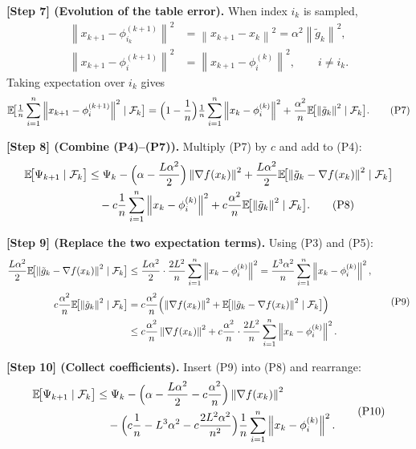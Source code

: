 \documentclass{article}
\newcommand{\E}{\mathbb{E}}
\newcommand{\norm}[1]{\left\|#1\right\|}
\newcommand{\grad}{\nabla}
\begin{document}
\noindent\textbf{[Step 7] (Evolution of the table error).}  
When index $i_k$ is sampled,
\[
\begin{aligned}
\norm{x_{k+1}-\phi_{i_k}^{(k+1)}}^{2}
&= \norm{x_{k+1}-x_k}^{2}= \alpha^{2}\norm{\tilde g_k}^{2},\\
\norm{x_{k+1}-\phi_{i}^{(k+1)}}^{2}
&= \norm{x_{k+1}-\phi_{i}^{(k)}}^{2},
\qquad i\neq i_k .
\end{aligned}
\]
Taking expectation over $i_k$ gives
\[
\E\!\bigl[\tfrac1n\sum_{i=1}^{n}\norm{x_{k+1}-\phi_i^{(k+1)}}^{2}\mid\mathcal{F}_k\bigr]
= \Bigl(1-\frac1n\Bigr)\tfrac1n\sum_{i=1}^{n}\norm{x_k-\phi_i^{(k)}}^{2}
   +\frac{\alpha^{2}}{n}\E\!\bigl[\norm{\tilde g_k}^{2}\mid\mathcal{F}_k\bigr].
\tag{P7}
\]

\noindent\textbf{[Step 8] (Combine (P4)–(P7)).}  
Multiply (P7) by $c$ and add to (P4):
\[
\begin{aligned}
\E\!\bigl[\Psi_{k+1}\mid\mathcal{F}_k\bigr]
&\le \Psi_k 
   -\Bigl(\alpha-\frac{L\alpha^{2}}{2}\Bigr)\norm{\grad f(x_k)}^{2}
   +\frac{L\alpha^{2}}{2}\E\!\bigl[\norm{\tilde g_k-\grad f(x_k)}^{2}\mid\mathcal{F}_k\bigr] \\
&\quad
   -c\frac1n\sum_{i=1}^{n}\norm{x_k-\phi_i^{(k)}}^{2}
   +c\frac{\alpha^{2}}{n}\E\!\bigl[\norm{\tilde g_k}^{2}\mid\mathcal{F}_k\bigr].
\tag{P8}
\end{aligned}
\]

\noindent\textbf{[Step 9] (Replace the two expectation terms).}  
Using (P3) and (P5):
\[
\begin{aligned}
\frac{L\alpha^{2}}{2}\E\!\bigl[\norm{\tilde g_k-\grad f(x_k)}^{2}\mid\mathcal{F}_k\bigr]
&\le \frac{L\alpha^{2}}{2}\cdot\frac{2L^{2}}{n}\sum_{i=1}^{n}\norm{x_k-\phi_i^{(k)}}^{2}
   =\frac{L^{3}\alpha^{2}}{n}\sum_{i=1}^{n}\norm{x_k-\phi_i^{(k)}}^{2},\\[1mm]
c\frac{\alpha^{2}}{n}\E\!\bigl[\norm{\tilde g_k}^{2}\mid\mathcal{F}_k\bigr]
&=c\frac{\alpha^{2}}{n}\Bigl(\norm{\grad f(x_k)}^{2}
   +\E\!\bigl[\norm{\tilde g_k-\grad f(x_k)}^{2}\mid\mathcal{F}_k\bigr]\Bigr)\\
&\le c\frac{\alpha^{2}}{n}\norm{\grad f(x_k)}^{2}
   +c\frac{\alpha^{2}}{n}\cdot\frac{2L^{2}}{n}\sum_{i=1}^{n}\norm{x_k-\phi_i^{(k)}}^{2}.
\end{aligned}
\tag{P9}
\]

\noindent\textbf{[Step 10] (Collect coefficients).}  
Insert (P9) into (P8) and rearrange:
\[
\begin{aligned}
\E\!\bigl[\Psi_{k+1}\mid\mathcal{F}_k\bigr]
&\le \Psi_k
   -\Bigl(\alpha-\frac{L\alpha^{2}}{2}
          -c\frac{\alpha^{2}}{n}\Bigr)\norm{\grad f(x_k)}^{2} \\
&\quad
   -\Bigl(c\frac1n - L^{3}\alpha^{2}
          -c\frac{2L^{2}\alpha^{2}}{n^{2}}\Bigr)
      \frac1n\sum_{i=1}^{n}\norm{x_k-\phi_i^{(k)}}^{2}.
\end{aligned}
\tag{P10}
\]
\end{document}

